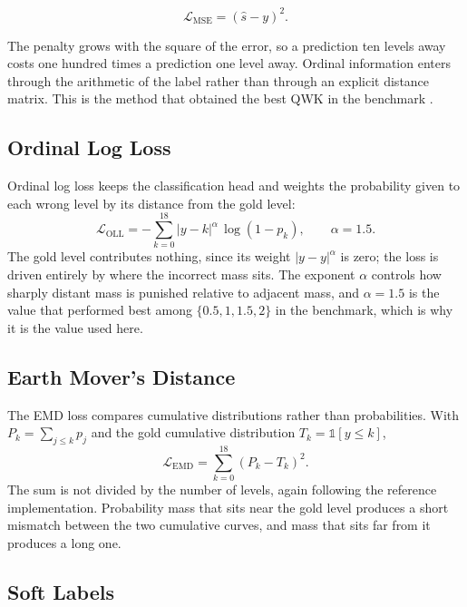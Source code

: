 \begin{equation}
\mathcal{L}_{\text{MSE}} = (\hat{s}-y)^2 .
\end{equation}

The penalty grows with the square of the error, so a prediction ten levels away costs one
hundred times a prediction one level away. Ordinal information enters through the arithmetic of
the label rather than through an explicit distance matrix. This is the method that obtained the
best QWK in the benchmark \cite{elmadani2025barec}.

\subsection{Ordinal Log Loss}

Ordinal log loss \cite{castagnos2022ordinal} keeps the classification head and weights the
probability given to each wrong level by its distance from the gold level:
\begin{equation}
\mathcal{L}_{\text{OLL}} = -\sum_{k=0}^{18} |y-k|^{\alpha}\,\log\left(1-p_k\right),
\qquad \alpha = 1.5 .
\end{equation}
The gold level contributes nothing, since its weight $|y-y|^{\alpha}$ is zero; the loss is
driven entirely by where the incorrect mass sits. The exponent $\alpha$ controls how sharply
distant mass is punished relative to adjacent mass, and $\alpha=1.5$ is the value that performed
best among $\{0.5, 1, 1.5, 2\}$ in the benchmark, which is why it is the value used here.

\subsection{Earth Mover's Distance}

The EMD loss \cite{hou2017emd} compares cumulative distributions rather than probabilities.
With $P_k=\sum_{j\leq k}p_j$ and the gold cumulative distribution
$T_k = \mathbb{1}[y \leq k]$,
\begin{equation}
\mathcal{L}_{\text{EMD}} = \sum_{k=0}^{18}\left(P_k - T_k\right)^2 .
\end{equation}
The sum is not divided by the number of levels, again following the reference implementation.
Probability mass that sits near the gold level produces a short mismatch between the two
cumulative curves, and mass that sits far from it produces a long one.

\subsection{Soft Labels}

